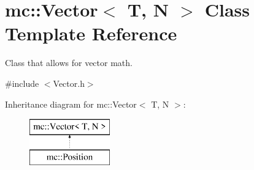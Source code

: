 \hypertarget{classmc_1_1_vector}{}\section{mc\+:\+:Vector$<$ T, N $>$ Class Template Reference}
\label{classmc_1_1_vector}


Class that allows for vector math.  




{\ttfamily \#include $<$Vector.\+h$>$}

Inheritance diagram for mc\+:\+:Vector$<$ T, N $>$\+:\begin{figure}[H]
\begin{center}
\leavevmode
\includegraphics[height=2.000000cm]{classmc_1_1_vector}
\end{center}
\end{figure}
